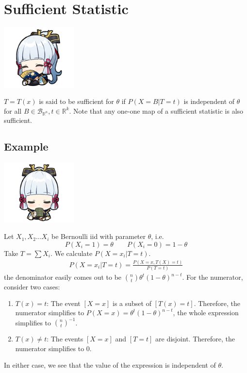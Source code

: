 \documentclass[oneside]{book}
\begin{document}
\section{Sufficient Statistic}
\begin{marginfigure}%
    \includegraphics[width=1.5in]{chibis/file_017.png}
\end{marginfigure}%
$T=T(x)$ is said to be sufficient for $\theta$ if $P(X=B|T=t)$ is independent of $\theta$ for all $B\in\mathcal B_{\mathbb R^n},t\in\mathbb R^k$.
Note that any one-one map of a sufficient statistic is also sufficient.
\subsection{Example}
\begin{marginfigure}%
    \includegraphics[width=1.5in]{chibis/file_018.png}
\end{marginfigure}%
Let $X_1,X_2\hdots X_i$ be Bernoulli iid with parameter $\theta$, i.e.
$$P(X_i=1)=\theta\qquad P(X_i=0)=1-\theta$$
Take $T=\sum X_i$. We calculate $P(X=x_i|T=t)$. 
\begin{align*}
    P(X=x_i|T=t)=\frac{P(X=x,T(X)=t)}{P(T=t)}
\end{align*}
the denominator easily comes out to be ${n\choose t}\theta^t(1-\theta)^{n-t}$. For the numerator, consider two cases:
\begin{enumerate}
    \item $T(x)=t$: The event $[X=x]$ is a subset of $[T(x)=t]$. Therefore, the numerator simplifies to $P(X=x)=\theta^t(1-\theta)^{n-t}$, the whole expression simplifies to ${n\choose t}^{-1}$.
    \item $T(x)\ne t$: The events $[X=x]$ and $[T=t]$ are disjoint. Therefore, the numerator simplifies to 0.
\end{enumerate}
In either case, we see that the value of the expression is independent of $\theta$.
\end{document}
